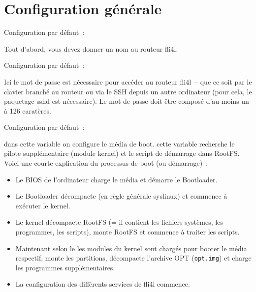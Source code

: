
\section{Configuration générale}

\begin{description}

  Configuration par défaut~: 

  {Tout d'abord, vous devez donner un nom au routeur fli4l.}


  Configuration par défaut~: 

    Ici le mot de passe est nécessaire pour accéder au routeur fli4l~--
    que ce soit par le clavier branché au routeur ou via le SSH depuis un autre
    ordinateur (pour cela, le paquetage sshd est nécessaire). Le mot de passe
	doit être composé d'au moins un à 126 caratères.


  Configuration par défaut~: 

   dans cette variable on configure le média de boot. cette
  variable recherche le pilote supplémentaire (module kernel) et le script de
  démarrage dans RootFS. Voici une courte explication du processus de boot
  (ou démarrage)~:

  \begin{itemize}
  \item Le BIOS de l'ordinateur charge le média et démarre le Bootloader.
  \item Le Bootloader décompacte (en règle générale syslinux) et commence à
    exécuter le kernel.
  \item Le kernel décompacte RootFS (= il contient les fichiers systèmes, les
    programmes, les scripts), monte RootFS et commence à traiter les scripts.
  \item Maintenant selon le  les modules du kernel sont chargés
    pour booter le média respectif, monte les partitions, décompacte l'archive OPT
    (\texttt{opt.img}) et charge les programmes supplémentaires.
  \item La configuration des différents services de fli4l commence.
  \end{itemize}


\end{description}
